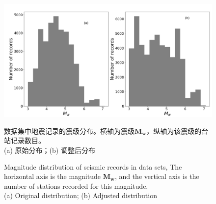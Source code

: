 \begin{figure}[!h] 
\centering 
 \includegraphics[width=0.95\linewidth]{img/event_dist.png} 
 \renewcommand{\figurename}{图} 
\caption{数据集中地震记录的震级分布。横轴为震级$\mathbf{M}_{\mathbf{w}}$，纵轴为该震级的台站记录数目。\\
(a) 原始分布；(b) 调整后分布} 
\addtocounter{figure}{-1} \vspace{-5pt} 
\renewcommand{\figurename}{Fig} 
\caption{Magnitude distribution of seismic records in data sets, The horizontal axis is the magnitude $\mathbf{M}_{\mathbf{w}}$, and the vertical axis is the number of stations recorded for this magnitude.\\
(a) Original distribution; (b) Adjusted distribution} 
\renewcommand{\figurename}{图} 
\label{fig:network-device-influence.png} 
\end{figure}


